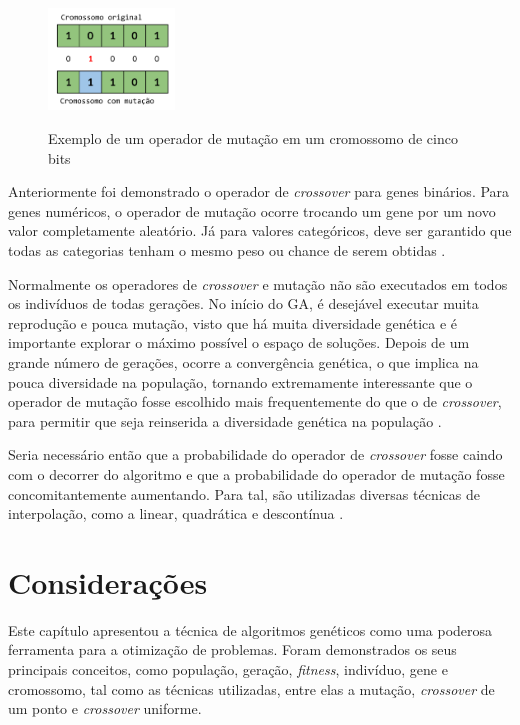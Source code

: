 \documentclass[12pt,oneside,a4paper,english,french,spanish,brazil,]{abntex2}
\begin{document}
\begin{figure}[ht]
\centering
\caption{Exemplo de um operador de mutação em um cromossomo de cinco bits}
\includegraphics[width=0.3\textwidth]{imagens/GA_Mutacao.pdf}
\label{fig:GA_Mutacao}
\end{figure}

Anteriormente foi demonstrado o operador de \textit{crossover} para genes binários. Para genes numéricos, o operador de mutação ocorre trocando um gene por um novo valor completamente aleatório. Já para valores categóricos, deve ser garantido que todas as categorias tenham o mesmo peso ou chance de serem obtidas \cite{linden:2008}.

Normalmente os operadores de \textit{crossover} e mutação não são executados em todos os indivíduos de todas gerações. No início do GA, é desejável executar muita reprodução e pouca mutação, visto que há muita diversidade genética e é importante explorar o máximo possível o espaço de soluções. Depois de um grande número de gerações, ocorre a convergência genética, o que implica na pouca diversidade na população, tornando extremamente interessante que o operador de mutação fosse escolhido mais frequentemente do que o de \textit{crossover}, para permitir que seja reinserida a diversidade genética na população \cite{linden:2008}.

Seria necessário então que a probabilidade do operador de \textit{crossover} fosse caindo com o decorrer do algoritmo e que a probabilidade do operador de mutação fosse concomitantemente aumentando. Para tal, são utilizadas diversas técnicas de interpolação, como a linear, quadrática e descontínua \cite{linden:2008}.

\section{Considerações}

Este capítulo apresentou a técnica de algoritmos genéticos como uma poderosa ferramenta para a otimização de problemas. Foram demonstrados os seus principais conceitos, como população, geração, \textit{fitness}, indivíduo, gene e cromossomo, tal como as técnicas utilizadas, entre elas a mutação, \textit{crossover} de um ponto e \textit{crossover} uniforme.
\end{document}
